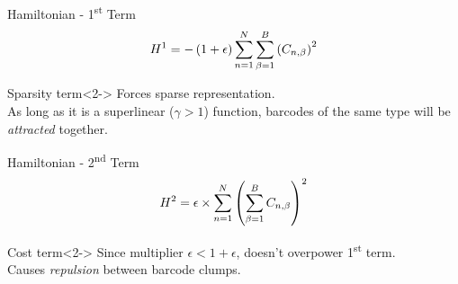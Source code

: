 \documentclass[10pt]{beamer}
\begin{document}
\begin{frame}{Hamiltonian - 1\textsuperscript{st} Term}
    \begin{equation*}
        \centering
        H^1 =
        - \left( 1 + \epsilon \right)
        \sum^{N}_{n=1} \sum^{B}_{\beta=1}
        \left( C_{n,\beta} \right) ^ 2
    \end{equation*}
    \begin{alertblock}{\centering Sparsity term}<2->
        \centering
        Forces sparse representation. \\
        As long as it is a superlinear ($\gamma>1$) function,
        barcodes of the same type will be \textit{attracted} together.
    \end{alertblock}
\end{frame}

\begin{frame}{Hamiltonian - 2\textsuperscript{nd} Term}
    \begin{equation*}
        \centering
        H^2 =
        \epsilon \times
        \sum^{N}_{n=1} \left( \sum^{B}_{\beta=1}
        C_{n,\beta} \right) ^ 2
    \end{equation*}
    \begin{alertblock}{\centering Cost term}<2->
        Since multiplier $\epsilon<1+\epsilon$, doesn't overpower 1\textsuperscript{st} term. \\
        Causes \textit{repulsion} between barcode clumps.
    \end{alertblock}
\end{frame}
\end{document}
